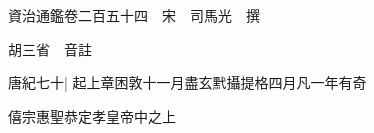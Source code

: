 






























































資治通鑑卷二百五十四　宋　司馬光　撰

胡三省　音註

唐紀七十|{
	起上章困敦十一月盡玄黓攝提格四月凡一年有奇}


僖宗惠聖恭定孝皇帝中之上

